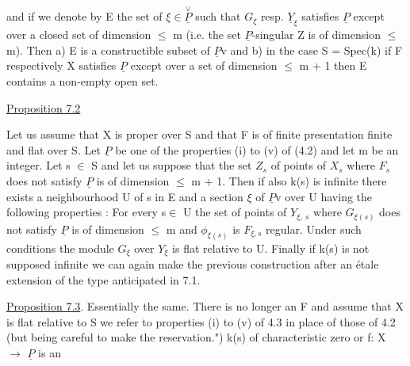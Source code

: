 
and if we denote by E the set of $\xi \in \overset{\vee}{\underline{P}}$ such that $G_\xi$ resp. $\underline{Y}_\xi$
satisfies $\underline{P}$ except over a closed set of dimension $\leq$ m (i.e. the
set $\underline{P}$-singular Z is of dimension $\leq$ m).  Then a) E is a
constructible subset of $\underline{P}\mathrm{v}$ and b) in the case S = Spec(k) if F
respectively X satisfies $\underline{P}$ except over a set of dimension $\leq$ m + 1
then E contains a non-empty open set.

\uline{Proposition 7.2}

Let us assume that X is proper over S and that F is of finite
presentation finite and flat over S.  Let $\underline{P}$ be one of the
properties (i) to (v) of (4.2) and let m be an integer.  Let s $\in$ S
and let us suppose that the set $Z_s$ of points of $X_s$ where $F_s$ does
not satisfy $\underline{P}$ is of dimension $\leq$ m + 1.  Then if also k(s) is
infinite there exists a neighbourhood U of s in E and a section $\xi$
of $\underline{P}\mathrm{v}$ over U having the following properties :  For every s$\in$ U the
set of points of $Y_{\xi,\ s}$ where $G_{\xi(s)}$ does not satisfy $\underline{P}$ is of
dimension $\leq$ m and $\phi_{\xi(s)}$ is $F_{\xi,s}$ regular.  Under such conditions the
module $G_\xi$ over $Y_\xi$ is flat relative to U.  Finally if k(s) is not
supposed infinite we can again make the previous construction
after an étale extension of the type anticipated in 7.1.

\uline{Proposition 7.3}.  Essentially the same.  There is no longer an F
and assume that X is flat relative to S we refer to properties (i)
to (v) of 4.3 in place of those of 4.2 (but being careful to make
the reservation.")  k(s) of characteristic zero or f: X $\rightarrow$ $\underline{P}$ is an

